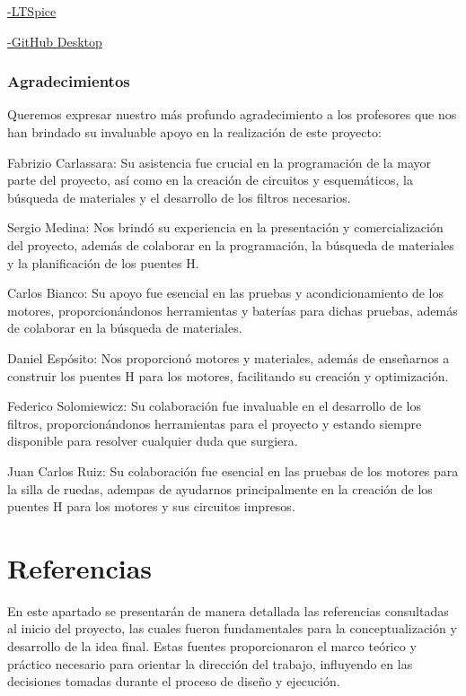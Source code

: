 \documentclass{article}
\begin{document}
    \href{https://www.analog.com/en/resources/design-tools-and-calculators/ltspice-simulator.html}{-LTSpice}
    \newline

    \href{https://github.com/apps/desktop}{-GitHub Desktop}

\subsubsection{Agradecimientos}

Queremos expresar nuestro más profundo agradecimiento a los profesores que nos han brindado su invaluable apoyo en la realización de este proyecto:


Fabrizio Carlassara: Su asistencia fue crucial en la programación de la mayor parte del proyecto, así como en la creación de circuitos y esquemáticos, la búsqueda de materiales y el desarrollo de los filtros necesarios.


Sergio Medina: Nos brindó su experiencia en la presentación y comercialización del proyecto, además de colaborar en la programación, la búsqueda de materiales y la planificación de los puentes H.


Carlos Bianco: Su apoyo fue esencial en las pruebas y acondicionamiento de los motores, proporcionándonos herramientas y baterías para dichas pruebas, además de colaborar en la búsqueda de materiales.


Daniel Espósito: Nos proporcionó motores y materiales, además de enseñarnos a construir los puentes H para los motores, facilitando su creación y optimización.


Federico Solomiewicz: Su colaboración fue invaluable en el desarrollo de los filtros, proporcionándonos herramientas para el proyecto y estando siempre disponible para resolver cualquier duda que surgiera.


Juan Carlos Ruiz: Su colaboración fue esencial en las pruebas de los motores para la silla de ruedas, adempas de ayudarnos principalmente en la creación de los puentes H para los motores y sus circuitos impresos.



\section{Referencias}
En este apartado se presentarán de manera detallada las referencias consultadas al inicio del proyecto, las cuales fueron fundamentales para la conceptualización y desarrollo de la idea final. Estas fuentes proporcionaron el marco teórico y práctico necesario para orientar la dirección del trabajo, influyendo en las decisiones tomadas durante el proceso de diseño y ejecución.
\end{document}
